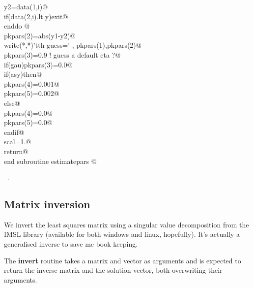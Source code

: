 \documentclass[10pt,a4paper,notitlepage]{article}
\newcommand{\code}[1]{\textbf{\textsf{#1}}} %
\begin{document}
\begin{flushleft}
\begin{minipage}{\linewidth}
\begin{list}{}{}
\mbox{}\verb@        y2=data(1,i)@\\
\mbox{}\verb@        if(data(2,i).lt.y)exit@\\
\mbox{}\verb@      enddo      @\\
\mbox{}\verb@      pkpars(2)=abs(y1-y2)@\\
\mbox{}\verb@      write(*,*)'tth guess=' , pkpars(1),pkpars(2)@\\
\mbox{}\verb@      pkpars(3)=0.9 ! guess a default eta ?@\\
\mbox{}\verb@      if(gau)pkpars(3)=0.0@\\
\mbox{}\verb@      if(asy)then@\\
\mbox{}\verb@       pkpars(4)=0.001@\\
\mbox{}\verb@       pkpars(5)=0.002@\\
\mbox{}\verb@      else@\\
\mbox{}\verb@       pkpars(4)=0.0@\\
\mbox{}\verb@       pkpars(5)=0.0@\\
\mbox{}\verb@      endif@\\
\mbox{}\verb@      scal=1.@\\
\mbox{}\verb@      return@\\
\mbox{}\verb@      end subroutine estimatepars                                            @{\NWsep}
\end{list}
\vspace{-1.5ex}
\footnotesize
\begin{list}{}{\setlength{\itemsep}{-\parsep}\setlength{\itemindent}{-\leftmargin}}
\item \NWtxtMacroRefIn\ .

\item{}
\end{list}
\end{minipage}\vspace{4ex}
\end{flushleft}
\subsection{Matrix inversion}

We invert the least squares matrix using a singular value decomposition from
the IMSL library (available for both windows and linux, hopefully).
It's actually a generalised inverse to save me book keeping.


The \code{invert} routine takes a matrix and vector as arguments and 
is expected to return the inverse matrix and the solution vector, both 
overwriting their arguments.
\end{document}
